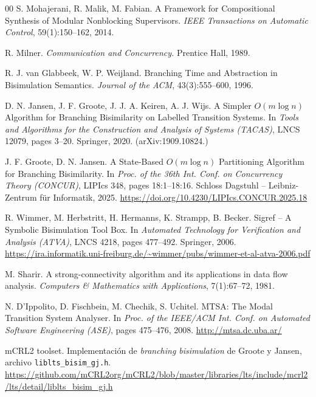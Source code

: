 \begin{thebibliography}{00}
   S. Mohajerani, R. Malik, M. Fabian. A Framework for Compositional Synthesis of Modular Nonblocking Supervisors. \textit{IEEE Transactions on Automatic Control}, 59(1):150--162, 2014.


   R. Milner. \textit{Communication and Concurrency.} Prentice Hall, 1989.

   R. J. van Glabbeek, W. P. Weijland. Branching Time and Abstraction in Bisimulation Semantics. \textit{Journal of the ACM}, 43(3):555--600, 1996.

   D. N. Jansen, J. F. Groote, J. J. A. Keiren, A. J. Wijs. A Simpler $O(m \log n)$ Algorithm for Branching Bisimilarity on Labelled Transition Systems. In \textit{Tools and Algorithms for the Construction and Analysis of Systems (TACAS)}, LNCS 12079, pages 3--20. Springer, 2020. (arXiv:1909.10824.)

   J. F. Groote, D. N. Jansen. A State-Based $O(m \log n)$ Partitioning Algorithm for Branching Bisimilarity. In \textit{Proc. of the 36th Int. Conf. on Concurrency Theory (CONCUR)}, LIPIcs 348, pages 18:1--18:16. Schloss Dagstuhl -- Leibniz-Zentrum für Informatik, 2025. \url{https://doi.org/10.4230/LIPIcs.CONCUR.2025.18}

   R. Wimmer, M. Herbstritt, H. Hermanns, K. Strampp, B. Becker. Sigref -- A Symbolic Bisimulation Tool Box. In \textit{Automated Technology for Verification and Analysis (ATVA)}, LNCS 4218, pages 477--492. Springer, 2006. \url{https://ira.informatik.uni-freiburg.de/~wimmer/pubs/wimmer-et-al-atva-2006.pdf}

   M. Sharir. A strong-connectivity algorithm and its applications in data flow analysis. \textit{Computers \& Mathematics with Applications}, 7(1):67--72, 1981.


   N. D'Ippolito, D. Fischbein, M. Chechik, S. Uchitel. MTSA: The Modal Transition System Analyser. In \textit{Proc. of the IEEE/ACM Int. Conf. on Automated Software Engineering (ASE)}, pages 475--476, 2008. \url{http://mtsa.dc.uba.ar/}

   mCRL2 toolset. Implementación de \textit{branching bisimulation} de Groote y Jansen, archivo \texttt{liblts\_bisim\_gj.h}. \url{https://github.com/mCRL2org/mCRL2/blob/master/libraries/lts/include/mcrl2/lts/detail/liblts_bisim_gj.h}

\end{thebibliography}

